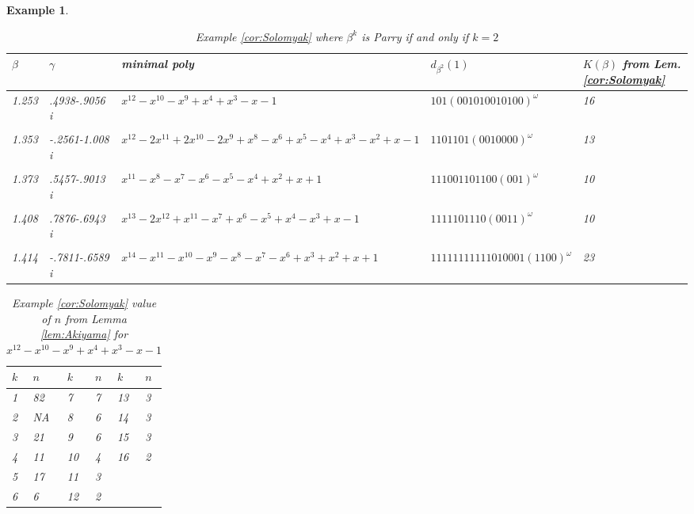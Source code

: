 \documentclass[12pt]{article}
\theoremstyle{plain}
\newtheorem{example}[theorem]{Example}
\theoremstyle{remark}
\begin{document}
\begin{example}
 \begin{table}\begin{center}
 \begin{tabular}{|llp{4cm}lp{1.6cm}|} \hline
 $\beta$ & $\gamma$ & minimal poly & $d_{\beta^2}(1)$ & $K(\beta)$ from Lem. \ref{cor:Solomyak} \\
\hline
1.253 & .4938-.9056 i & $x^{12}-x^{10}-x^{9}+x^{4}+x^{3}-x-1$ & $1 0 1 (0 0 1 0 1 0 0 1 0 1 0 0)^{\omega}$ & 16\\ &&&& \\
1.353 & -.2561-1.008 i & $x^{12}-2x^{11}+2x^{10}-2x^{9}+x^{8}-x^{6}+x^{5}-x^{4}+x^{3}-x^{2}+x-1$ & $1 1 0 1 1 0 1 (0 0 1 0 0 0 0)^{\omega}$ & 13\\ &&&& \\
1.373 & .5457-.9013 i & $x^{11}-x^{8}-x^{7}-x^{6}-x^{5}-x^{4}+x^{2}+x+1$ & $1 1 1 0 0 1 1 0 1 1 0 0 (0 0 1)^{\omega}$ & 10\\ &&&&\\
1.408 & .7876-.6943 i & $x^{13}-2x^{12}+x^{11}-x^{7}+x^{6}-x^{5}+x^{4}-x^{3}+x-1$ & $1 1 1 1 1 0 1 1 1 0 (0 0 1 1)^{\omega}$ & 10\\ &&&&\\
1.414 & -.7811-.6589 i & $x^{14}-x^{11}-x^{10}-x^{9}-x^{8}-x^{7}-x^{6}+x^{3}+x^{2}+x+1$ & $1 1 1 1 1 1 1 1 1 1 1 0 1 0 0 0 1 (1 1 0 0)^{\omega}$ & 23\\ \hline
 \end{tabular}
 \caption{Example \ref{cor:Solomyak} where $\beta^k$ is Parry if and only if $k = 2$}\label{tab:perron}\end{center}
 \end{table}

\begin{table} 
 \begin{center} 
 \begin{tabular}{|ll|ll|ll|} 
 \hline 
 $k$ & $n$ & $k$ & $n$ &$k$ & $n$ \\ \hline 
1 & 82 & 7 & 7 & 13 & 3 \\ 
2 & NA & 8 & 6 & 14 & 3 \\ 
3 & 21 & 9 & 6 & 15 & 3 \\ 
4 & 11 & 10 & 4 & 16 & 2 \\ 
5 & 17 & 11 & 3 & &\\ 
6 & 6 & 12 & 2 & &\\ 
\hline
\end{tabular}
 \end{center} 
 \caption{Example \ref{cor:Solomyak} value of $n$ from Lemma \ref{lem:Akiyama} for $x^{12}-x^{10}-x^{9}+x^{4}+x^{3}-x-1$} \label{tab:K}
 \end{table} 
\end{example}
\end{document}

